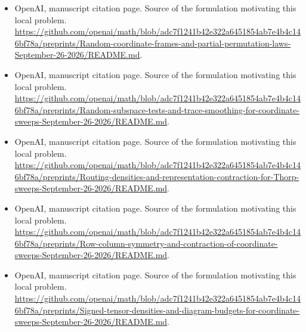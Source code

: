 \documentclass[11pt]{article}
\begin{document}
\begin{itemize}
\item[S9] OpenAI, manuscript citation page. Source of the formulation motivating this local problem.
\url{https://github.com/openai/math/blob/adc7f1241b42e322a6451854ab7e4b4c146bf78a/preprints/Random-coordinate-frames-and-partial-permutation-laws-September-26-2026/README.md}.
\item[S10] OpenAI, manuscript citation page. Source of the formulation motivating this local problem.
\url{https://github.com/openai/math/blob/adc7f1241b42e322a6451854ab7e4b4c146bf78a/preprints/Random-subspace-tests-and-trace-smoothing-for-coordinate-sweeps-September-26-2026/README.md}.
\item[S11] OpenAI, manuscript citation page. Source of the formulation motivating this local problem.
\url{https://github.com/openai/math/blob/adc7f1241b42e322a6451854ab7e4b4c146bf78a/preprints/Routing-densities-and-representation-contraction-for-Thorp-sweeps-September-26-2026/README.md}.
\item[S12] OpenAI, manuscript citation page. Source of the formulation motivating this local problem.
\url{https://github.com/openai/math/blob/adc7f1241b42e322a6451854ab7e4b4c146bf78a/preprints/Row-column-symmetry-and-contraction-of-coordinate-sweeps-September-26-2026/README.md}.
\item[S13] OpenAI, manuscript citation page. Source of the formulation motivating this local problem.
\url{https://github.com/openai/math/blob/adc7f1241b42e322a6451854ab7e4b4c146bf78a/preprints/Signed-tensor-densities-and-diagram-budgets-for-coordinate-sweeps-September-26-2026/README.md}.
\end{itemize}
\end{document}
